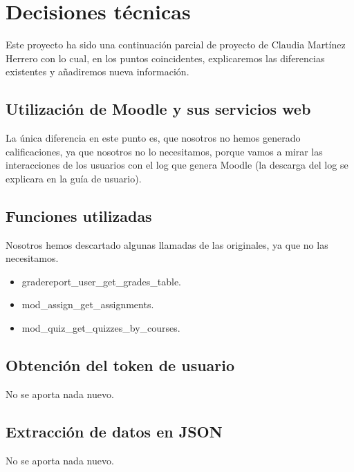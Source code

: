 \section{Decisiones técnicas}\label{decisiones-tecnicas}

Este proyecto ha sido una continuación parcial de proyecto de Claudia Martínez Herrero \cite{claudia} con lo cual, en los puntos coincidentes, explicaremos las diferencias existentes y añadiremos nueva información.

\subsection{Utilización de Moodle y sus servicios web}\label{utilizacióndemoodleysusserviciosweb}

La única diferencia en este punto es, que nosotros no hemos generado calificaciones, ya que nosotros no lo necesitamos, porque vamos a mirar las interacciones de los usuarios con el log que genera Moodle (la descarga del log se explicara en la guía de usuario).

\subsection{Funciones utilizadas}\label{funciones-utilizadas}

Nosotros hemos descartado algunas llamadas de las originales, ya que no las necesitamos.

\begin{itemize}
	\tightlist
	\item
	gradereport\_user\_get\_grades\_table.
	\item
	mod\_assign\_get\_assignments.
	\item
	mod\_quiz\_get\_quizzes\_by\_courses.
\end{itemize}

\subsection{Obtención del token de usuario}\label{obtención-del-token-de-usuario}

No se aporta nada nuevo.

\subsection{Extracción de datos en JSON}\label{extracción-de-datos-en-json}

No se aporta nada nuevo.

